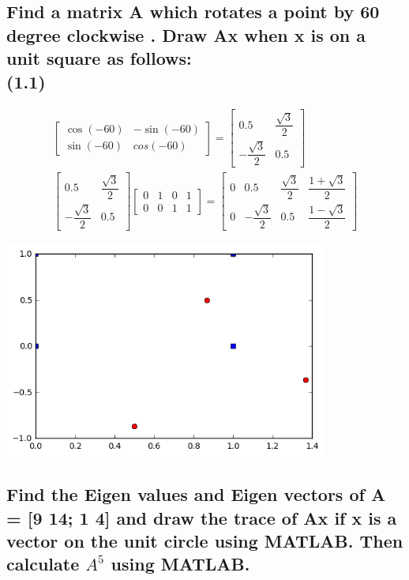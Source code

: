 \documentclass[12pt,a4paper]{article}
\begin{document}
\subsection{Find a matrix A which rotates a point by 60 degree clockwise .  Draw Ax when x is on a unit square as follows:\\(1.1)}

\begin{gather*}
\begin{bmatrix}
	\cos(-60)& -\sin(-60)\\ \sin(-60)& cos(-60)
\end{bmatrix}
=
\begin{bmatrix}
0.5&\dfrac{\sqrt{3}}{2}\\-\dfrac{\sqrt{3}}{2}&0.5
\end{bmatrix}\\
\begin{bmatrix}
0.5&\dfrac{\sqrt{3}}{2}\\-\dfrac{\sqrt{3}}{2}&0.5
\end{bmatrix}
\begin{bmatrix}
0&1&0&1\\0&0&1&1
\end{bmatrix}
=
\begin{bmatrix}
0&0.5&\dfrac{\sqrt{3}}{2}&\dfrac{1+\sqrt{3}}{2}\\
0&-\dfrac{\sqrt{3}}{2}&0.5&\dfrac{1-\sqrt{3}}{2}
\end{bmatrix}
\end{gather*}
\begin{center}
	\includegraphics[width=0.8\textwidth]{2.png}
\end{center}

\subsection{Find the Eigen values and Eigen vectors of A = [9 14; 1 4] and draw the trace of Ax if x is a vector on the unit circle using MATLAB.  Then calculate $A^5$ using MATLAB. } 
\end{document}

